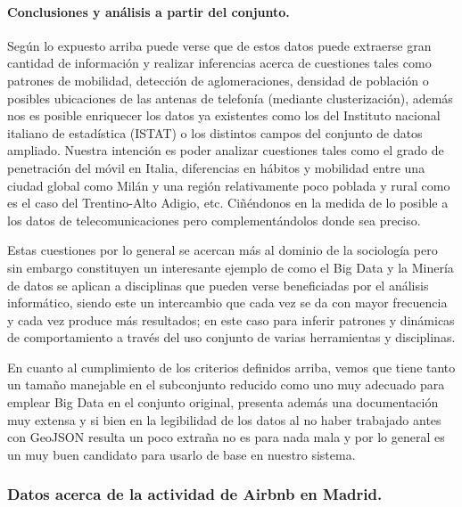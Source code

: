 \documentclass[11pt, a4paper]{article} %
\begin{document}
\paragraph{Conclusiones y análisis a partir del conjunto.}
Según lo expuesto arriba puede verse que de estos datos puede extraerse gran cantidad de información y realizar inferencias acerca de cuestiones tales como patrones de mobilidad, detección de aglomeraciones, densidad de población o posibles ubicaciones de las antenas de telefonía (mediante clusterización), además nos es posible enriquecer los datos ya existentes como los del Instituto nacional italiano de estadística (ISTAT) o los distintos campos del conjunto de datos ampliado. Nuestra intención es poder analizar cuestiones tales como el grado de penetración del móvil en Italia, diferencias en hábitos y mobilidad entre una ciudad global como Milán y una región relativamente poco poblada y rural como es el caso del Trentino-Alto Adigio, etc. Ciñéndonos en la medida de lo posible a los datos de telecomunicaciones pero complementándolos donde sea preciso.


Estas cuestiones por lo general se acercan más al dominio de la sociología pero sin embargo constituyen un interesante ejemplo de como el Big Data y la Minería de datos se aplican a disciplinas que pueden verse beneficiadas por el análisis informático, siendo este un intercambio que cada vez se da con mayor frecuencia y cada vez produce más resultados; en este caso para inferir patrones y dinámicas de comportamiento a través del uso conjunto de varias herramientas y disciplinas.


En cuanto al cumplimiento de los criterios definidos arriba, vemos que tiene tanto un tamaño manejable en el subconjunto reducido como uno muy adecuado para emplear Big Data en el conjunto original, presenta además una documentación muy extensa y si bien en la legibilidad de los datos al no haber trabajado antes con GeoJSON resulta un poco extraña no es para nada mala y por lo general es un muy buen candidato para usarlo de base en nuestro sistema.
\subsubsection{Datos acerca de la actividad de Airbnb en Madrid.}
\end{document}
